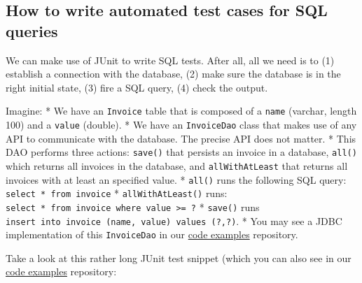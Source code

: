 \hypertarget{how-to-write-automated-test-cases-for-sql-queries}{%
\subsection{How to write automated test cases for SQL
queries}\label{how-to-write-automated-test-cases-for-sql-queries}}

We can make use of JUnit to write SQL tests. After all, all we need is
to (1) establish a connection with the database, (2) make sure the
database is in the right initial state, (3) fire a SQL query, (4) check
the output.

Imagine: * We have an \texttt{Invoice} table that is composed of a
\texttt{name} (varchar, length 100) and a \texttt{value} (double). * We
have an \texttt{InvoiceDao} class that makes use of any API to
communicate with the database. The precise API does not matter. * This
DAO performs three actions: \texttt{save()} that persists an invoice in
a database, \texttt{all()} which returns all invoices in the database,
and \texttt{allWithAtLeast} that returns all invoices with at least an
specified value. * \texttt{all()} runs the following SQL query:
\texttt{select\ *\ from\ invoice} * \texttt{allWithAtLeast()} runs:
\texttt{select\ *\ from\ invoice\ where\ value\ \textgreater{}=\ ?} *
\texttt{save()} runs
\texttt{insert\ into\ invoice\ (name,\ value)\ values\ (?,?)}. * You may
see a JDBC implementation of this \texttt{InvoiceDao} in our
\href{https://github.com/sttp-book/code-examples/blob/master/src/main/java/tudelft/mocks/invoice/InvoiceDao.java}{code
examples} repository.

Take a look at this rather long JUnit test snippet (which you can also
see in our
\href{https://github.com/sttp-book/code-examples/blob/master/src/test/java/tudelft/mocks/invoice/InvoiceDaoIntegrationTest.java}{code
examples} repository:

